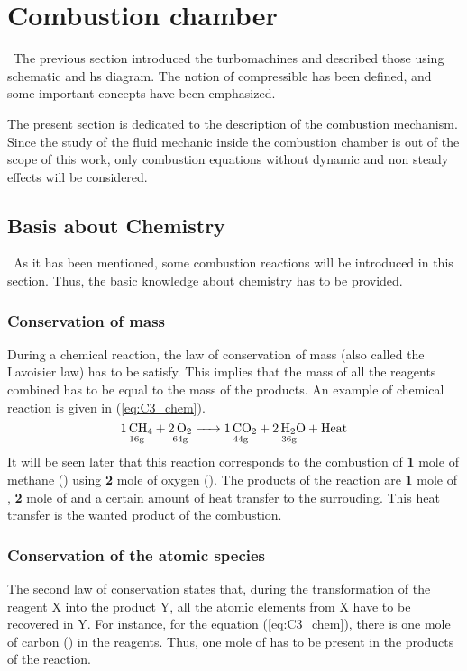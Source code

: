 \section{Combustion chamber}
\quad\, The previous section introduced the turbomachines and described those using schematic and hs diagram. The notion of compressible has been defined, and some important concepts have been emphasized. 

The present section is dedicated to the description of the combustion mechanism. Since the study of the fluid mechanic inside the combustion chamber is out of the scope of this work, only combustion equations without dynamic and non steady effects will be considered.

\subsection{Basis about Chemistry}
\quad\, As it has been mentioned, some combustion reactions will be introduced in this section. Thus, the basic knowledge about chemistry has to be provided.\\

\subsubsection{Conservation of mass}
During a chemical reaction, the law of conservation of mass (also called the Lavoisier law) has to be satisfy. This implies that the mass of all the reagents combined has to be equal to the mass of the products. An example of chemical reaction is given in (\ref{eq:C3_chem}).
\begin{equation}
\underset{\mathrm{16g}}{\ce{1CH4}} \ce{+} \underset{\mathrm{64g}}{\ce{2O2}} \ce{->} \underset{\mathrm{44g}}{\ce{1CO2}} \ce{+} \underset{\mathrm{36g}}{\ce{2H2O}} \ce{+}\text{Heat}\label{eq:C3_chem}
\end{equation}
It will be seen later that this reaction corresponds to the combustion of \textbf{1} mole of methane () using \textbf{2} mole of oxygen (). The products of the reaction are \textbf{1} mole of , \textbf{2} mole of  and a certain amount of heat transfer to the surrouding. This heat transfer is the wanted product of the combustion. 

\subsubsection{Conservation of the atomic species}
The second law of conservation states that, during the transformation of the reagent X into the product Y, all the atomic elements from X have to be recovered in Y. For instance, for the equation (\ref{eq:C3_chem}), there is one mole of carbon () in the reagents. Thus, one mole of  has to be present in the products of the reaction.
\newpage
